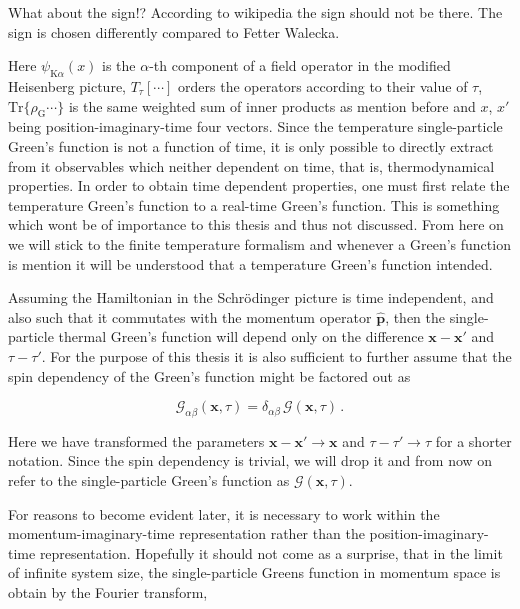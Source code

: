 \documentclass[12pt]{report}
\renewcommand{\vec}[1]{\boldsymbol{\mathbf{#1}}}                        %
\newcommand{\Gt}{\mathcal{G}}
\newcommand{\question}[1]{{\leavevmode\color{question}#1}}
\begin{document}
\question{What about the sign!? According to wikipedia the sign should not be there. The sign is chosen differently compared to Fetter Walecka.}

Here $ \psi_{\text{K} \alpha}(x) $ is the $ \alpha $-th component of a field operator in the modified Heisenberg picture, $ T_\tau [\cdots] $ orders the operators according to their value of $ \tau $,  $ \text{Tr} \{ \rho_\text{G} \cdots \} $ is the same weighted sum of inner products as mention before and $ x $, $ x' $ being position-imaginary-time four vectors. Since the temperature single-particle Green's function is not a function of time, it is only possible to directly extract from it observables which neither dependent on time, that is, thermodynamical properties. In order to obtain time dependent properties, one must first relate the temperature Green's function to a real-time Green's function. This is something which wont be of importance to this thesis and thus not discussed. From here on we will stick to the finite temperature formalism and whenever a Green's function is mention it will be understood that a temperature Green's function intended.

Assuming the Hamiltonian in the Schrödinger picture is time independent, and also such that it commutates with the momentum operator $ \hat{ \vec p} $, then the single-particle thermal Green's function will depend only on the difference $ \vec x - \vec x' $ and $ \tau - \tau' $. For the purpose of this thesis it is also sufficient to further assume that the spin dependency of the Green's function might be factored out as

\begin{equation}
	\Gt_{\alpha \beta}(\vec x, \tau) = \delta_{\alpha \beta} \, \Gt(\vec x, \tau) \,.
\end{equation}

Here we have transformed the parameters $ \vec x - \vec x' \rightarrow \vec x $ and $ \tau - \tau' \rightarrow \tau $ for a shorter notation. Since the spin dependency is trivial, we will drop it and from now on refer to the single-particle Green's function as $ \Gt (\vec x, \tau) $.

For reasons to become evident later, it is necessary to work within the momentum-imaginary-time representation rather than the position-imaginary-time representation. Hopefully it should not come as a surprise, that in the limit of infinite system size, the single-particle Greens function in momentum space is obtain by the Fourier transform,
\end{document}
